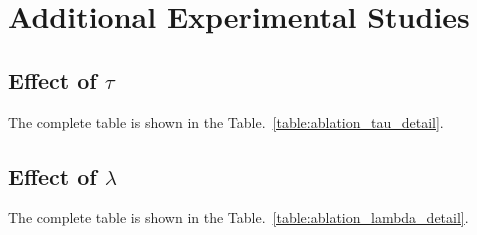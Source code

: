 \documentclass[sigconf]{acmart}
\begin{document}
\section{Additional Experimental Studies}

\subsection{Effect of $\tau$}

\label{appdix:tau}
The complete table is shown in the Table.~\ref{table:ablation_tau_detail}.



\subsection{Effect of $\lambda$}
\label{appdix:lambda}
The complete table is shown in the Table.~\ref{table:ablation_lambda_detail}.
\end{document}
